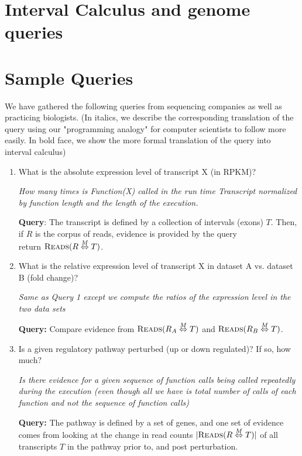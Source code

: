 \documentclass[10pt,fullpage]{article}
\def\ensuretext{\textrm}
\newcommand{\Reads}{\ensuretext{{\sc Reads}}}
\newcommand{\MapRel}{\ensuremath{\stackrel{M}{\Leftrightarrow}}}
\begin{document}
\section{Interval Calculus and genome queries}


\section{Sample Queries}

We have gathered the following queries from sequencing companies
as well as practicing biologists.  (In italics, we describe 
the corresponding translation of the query using our "programming
analogy" for computer scientists to follow more easily.  In bold
face, we show the more formal translation of the query into
interval calculus)

\begin{enumerate}

\item What is the absolute expression level of transcript X (in RPKM)? 

{\em How many times is Function(X) called in the run time Transcript normalized
by function length and the length of the execution.}

{\bf Query}: The transcript is defined by a collection of
intervals (exons) $T$. Then, if $R$ is the corpus of
reads, evidence is provided by the query\\
\noindent return $\Reads(R\MapRel T)$. 

\item What is the relative expression level of transcript X in dataset A vs. 
dataset B (fold change)? 

{\em Same as Query 1 except we compute the ratios of the expression
level in the  two data sets}

{\bf Query:} Compare evidence from $\Reads(R_A \MapRel T)$ and $\Reads(R_B \MapRel T)$.

\item Is a given regulatory pathway perturbed (up or down regulated)?  If so, how 
much? 

{\em Is there evidence for a given sequence of function calls being called
repeatedly during the execution (even though all we have is total number
of calls of each function and not the sequence of function calls)}

{\bf Query:} The pathway is defined by a set of genes, and one set of
evidence comes from looking at the change in read counts $|\Reads(R
\MapRel T)|$ of all transcripts $T$ in the pathway prior to, and post
perturbation.


\end{enumerate}
\end{document}
